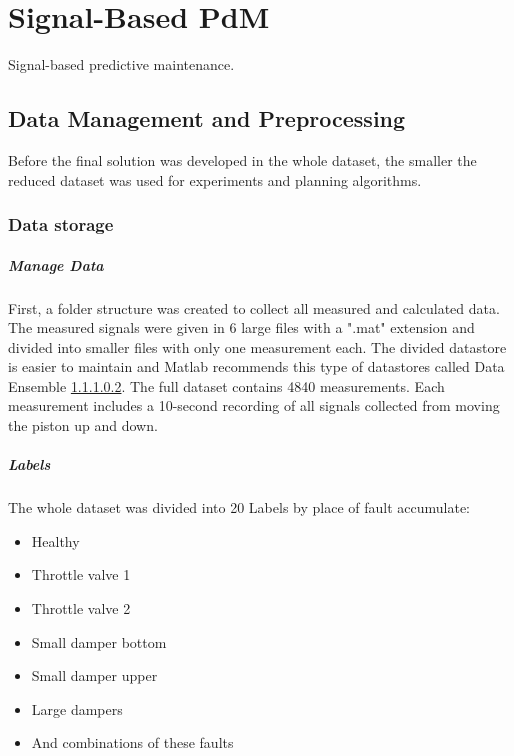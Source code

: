 %




\chapter{Signal-Based PdM}
Signal-based predictive maintenance.
\section{Data Management and Preprocessing}
Before the final solution was developed in the whole dataset, the smaller
the reduced dataset was used for experiments and planning algorithms. 

\subsection{Data storage}
\paragraph{Manage Data}
First, a folder structure was created to collect all measured and
calculated data. The measured signals were given in 6 large files with a
".mat" extension and divided into smaller files with only one measurement
each.  The divided datastore is easier to maintain and Matlab recommends
this type of datastores called Data Ensemble \ref{}.  The full dataset
contains 4840 measurements. Each measurement includes a 10-second recording
of all signals collected from moving the piston up and down.
\paragraph{Labels}
The whole dataset was divided into 20 Labels by place of fault accumulate: 
\begin{itemize}
    \item Healthy
    \item Throttle valve 1
    \item Throttle valve 2 
    \item Small damper bottom
    \item Small damper upper
    \item Large dampers 
    \item And combinations of these faults
\end{itemize}

